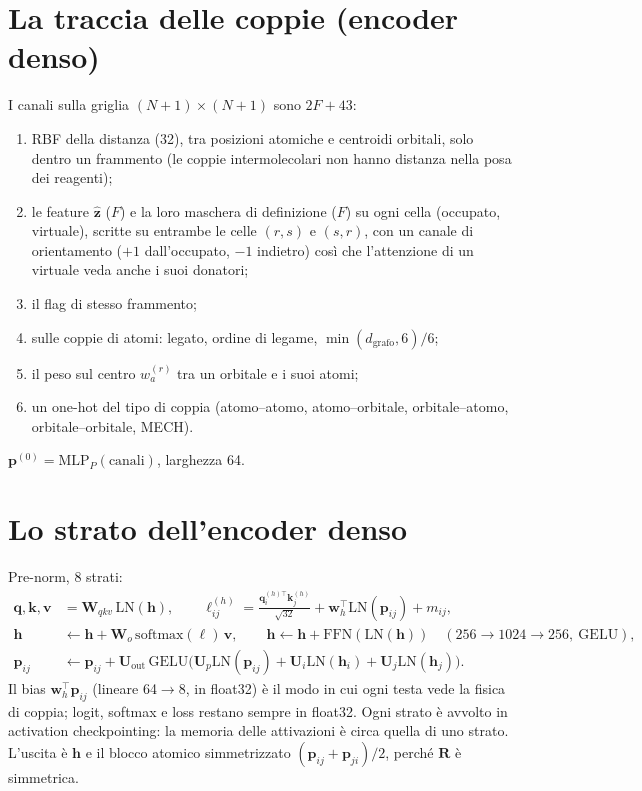 \documentclass[11pt,a4paper]{report}
\newcommand{\vb}[1]{\bm{#1}}
\begin{document}
\section{La traccia delle coppie (encoder denso)}
I canali sulla griglia $(N+1)\times(N+1)$ sono $2F+43$:
\begin{enumerate}
\item RBF della distanza (32), tra posizioni atomiche e centroidi orbitali, solo dentro un frammento
  (le coppie intermolecolari non hanno distanza nella posa dei reagenti);
\item le feature $\hat{\vb z}$ ($F$) e la loro maschera di definizione ($F$) su ogni cella
  (occupato, virtuale), scritte su entrambe le celle $(r,s)$ e $(s,r)$, con un canale di orientamento
  ($+1$ dall'occupato, $-1$ indietro) così che l'attenzione di un virtuale veda anche i suoi donatori;
\item il flag di stesso frammento;
\item sulle coppie di atomi: legato, ordine di legame, $\min(d_{\mathrm{grafo}},6)/6$;
\item il peso sul centro $w^{(r)}_a$ tra un orbitale e i suoi atomi;
\item un one-hot del tipo di coppia (atomo--atomo, atomo--orbitale, orbitale--atomo,
  orbitale--orbitale, MECH).
\end{enumerate}
$\vb{p}^{(0)}=\mathrm{MLP}_P(\text{canali})$, larghezza 64.

\section{Lo strato dell'encoder denso}
Pre-norm, 8 strati:
\begin{align*}
\vb{q},\vb{k},\vb{v}&=\vb{W}_{qkv}\,\mathrm{LN}(\vb{h}),\qquad
\ell^{(h)}_{ij}=\frac{\vb{q}_i^{(h)\top}\vb{k}_j^{(h)}}{\sqrt{32}}+\vb{w}_h^{\!\top}\mathrm{LN}(\vb{p}_{ij})+m_{ij},\\
\vb{h}&\leftarrow\vb{h}+\vb{W}_o\,\mathrm{softmax}(\ell)\,\vb{v},\qquad
\vb{h}\leftarrow\vb{h}+\mathrm{FFN}(\mathrm{LN}(\vb{h}))\quad(256\to1024\to256,\ \mathrm{GELU}),\\
\vb{p}_{ij}&\leftarrow\vb{p}_{ij}+\vb{U}_{\mathrm{out}}\,\mathrm{GELU}\big(\vb{U}_p\mathrm{LN}(\vb{p}_{ij})+\vb{U}_i\mathrm{LN}(\vb{h}_i)+\vb{U}_j\mathrm{LN}(\vb{h}_j)\big).
\end{align*}
Il bias $\vb{w}_h^{\!\top}\vb{p}_{ij}$ (lineare 64$\to$8, in float32) è il modo in cui ogni testa vede
la fisica di coppia; logit, softmax e loss restano sempre in float32. Ogni strato è avvolto in
activation checkpointing: la memoria delle attivazioni è circa quella di uno strato. L'uscita è
$\vb{h}$ e il blocco atomico simmetrizzato $(\vb{p}_{ij}+\vb{p}_{ji})/2$, perché $\vb{R}$ è simmetrica.
\end{document}
